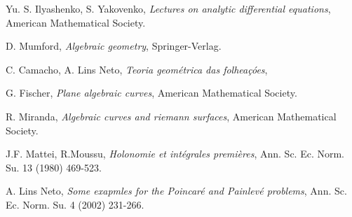 \begin{thebibliography}{9}
Yu. S. Ilyashenko, S. Yakovenko,
\emph{Lectures on analytic differential equations},
American Mathematical Society.

D. Mumford, 
\emph{Algebraic geometry},
Springer-Verlag.

C. Camacho, A. Lins Neto,
\emph{Teoria geométrica das folheaçóes},

G. Fischer,
\emph{Plane algebraic curves},
American Mathematical Society.

R. Miranda,
\emph{Algebraic curves and riemann surfaces},
American Mathematical Society.

J.F. Mattei, R.Moussu,
\emph{Holonomie et intégrales premières},
Ann. Sc. Ec. Norm. Su. 13 (1980) 469-523.

A. Lins Neto,
\emph{Some exapmles for the Poincaré and Painlevé problems},
Ann. Sc. Ec. Norm. Su. 4 (2002) 231-266.
\end{thebibliography}

